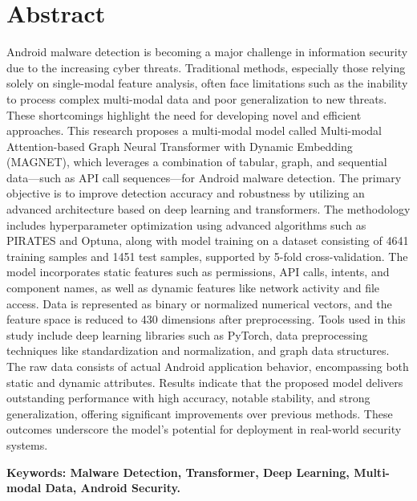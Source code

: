 \chapter*{\vspace{-3cm}\fontsize{16}{17}\selectfont \bfseries Abstract}
\thispagestyle{empty}
\vspace{-1.5cm}\setlength{\parindent}{0pt}\fontsize{12}{13}\selectfont
Android malware detection is becoming a major challenge in information security due to the increasing cyber threats. Traditional methods, especially those relying solely on single-modal feature analysis, often face limitations such as the inability to process complex multi-modal data and poor generalization to new threats. These shortcomings highlight the need for developing novel and efficient approaches. This research proposes a multi-modal model called Multi-modal Attention-based Graph Neural Transformer with Dynamic Embedding (MAGNET), which leverages a combination of tabular, graph, and sequential data—such as API call sequences—for Android malware detection. The primary objective is to improve detection accuracy and robustness by utilizing an advanced architecture based on deep learning and transformers. The methodology includes hyperparameter optimization using advanced algorithms such as PIRATES and Optuna, along with model training on a dataset consisting of 4641 training samples and 1451 test samples, supported by 5-fold cross-validation. The model incorporates static features such as permissions, API calls, intents, and component names, as well as dynamic features like network activity and file access. Data is represented as binary or normalized numerical vectors, and the feature space is reduced to 430 dimensions after preprocessing. Tools used in this study include deep learning libraries such as PyTorch, data preprocessing techniques like standardization and normalization, and graph data structures. The raw data consists of actual Android application behavior, encompassing both static and dynamic attributes. Results indicate that the proposed model delivers outstanding performance with high accuracy, notable stability, and strong generalization, offering significant improvements over previous methods. These outcomes underscore the model's potential for deployment in real-world security systems.

\par\vspace{.5cm}\setlength{\parindent}{0pt}
{\fontsize{13}{14}\selectfont\bfseries Keywords: Malware Detection, Transformer, Deep Learning, Multi-modal Data, Android Security.}
